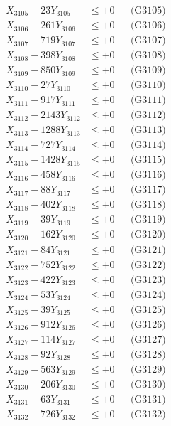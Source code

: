 \documentclass[a4paper,10pt]{article}
\begin{document}
{\begin{align}
X_{3105} - 23Y_{3105} &\leq +0 && \text{(G3105)} \\
X_{3106} - 261Y_{3106} &\leq +0 && \text{(G3106)} \\
X_{3107} - 719Y_{3107} &\leq +0 && \text{(G3107)} \\
X_{3108} - 398Y_{3108} &\leq +0 && \text{(G3108)} \\
X_{3109} - 850Y_{3109} &\leq +0 && \text{(G3109)} \\
X_{3110} - 27Y_{3110} &\leq +0 && \text{(G3110)} \\
\allowbreak
X_{3111} - 917Y_{3111} &\leq +0 && \text{(G3111)} \\
X_{3112} - 2143Y_{3112} &\leq +0 && \text{(G3112)} \\
X_{3113} - 1288Y_{3113} &\leq +0 && \text{(G3113)} \\
X_{3114} - 727Y_{3114} &\leq +0 && \text{(G3114)} \\
X_{3115} - 1428Y_{3115} &\leq +0 && \text{(G3115)} \\
X_{3116} - 458Y_{3116} &\leq +0 && \text{(G3116)} \\
X_{3117} - 88Y_{3117} &\leq +0 && \text{(G3117)} \\
X_{3118} - 402Y_{3118} &\leq +0 && \text{(G3118)} \\
X_{3119} - 39Y_{3119} &\leq +0 && \text{(G3119)} \\
X_{3120} - 162Y_{3120} &\leq +0 && \text{(G3120)} \\
\allowbreak
X_{3121} - 84Y_{3121} &\leq +0 && \text{(G3121)} \\
X_{3122} - 752Y_{3122} &\leq +0 && \text{(G3122)} \\
X_{3123} - 422Y_{3123} &\leq +0 && \text{(G3123)} \\
X_{3124} - 53Y_{3124} &\leq +0 && \text{(G3124)} \\
X_{3125} - 39Y_{3125} &\leq +0 && \text{(G3125)} \\
X_{3126} - 912Y_{3126} &\leq +0 && \text{(G3126)} \\
X_{3127} - 114Y_{3127} &\leq +0 && \text{(G3127)} \\
X_{3128} - 92Y_{3128} &\leq +0 && \text{(G3128)} \\
X_{3129} - 563Y_{3129} &\leq +0 && \text{(G3129)} \\
X_{3130} - 206Y_{3130} &\leq +0 && \text{(G3130)} \\
\allowbreak
X_{3131} - 63Y_{3131} &\leq +0 && \text{(G3131)} \\
X_{3132} - 726Y_{3132} &\leq +0 && \text{(G3132)} \\

\end{align}}
\end{document}
